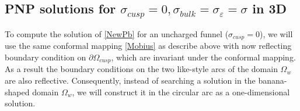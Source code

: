 \documentclass[12pt]{article}
\newcommand{\p}{\partial}
\newcommand{\eps}{\varepsilon}
\begin{document}
{\subsection{PNP solutions for $\sigma_{cusp}=0,\sigma_{bulk}=\sigma_{\eps}=\sigma$ in 3D }\label{s:Null}
To compute the solution of \eqref{NewPb} for an uncharged funnel ($\sigma_{cusp}=0$), we will use the same conformal mapping \eqref{Mobius} as describe above with now reflecting boundary condition on $\p\Omega_{cusp}$, which are invariant under the conformal mapping. As a result the boundary conditions on the two like-style arcs of the domain $\Omega_w$ are also reflective. Consequently, instead of searching a solution in the banana-shaped domain $\Omega_{w}$, we will construct it in the circular arc as a one-dimensional solution.

}
\end{document}
